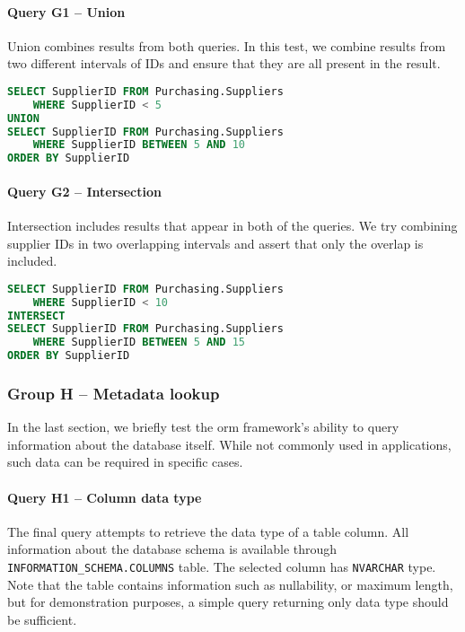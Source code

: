 \paragraph{Query G1 -- Union}
\label{query:g1}
Union combines results from both queries. In this test, we combine results from two different intervals of IDs and ensure that they are all present in the result.

\begin{lstlisting}[language=SQL]
SELECT SupplierID FROM Purchasing.Suppliers 
    WHERE SupplierID < 5
UNION
SELECT SupplierID FROM Purchasing.Suppliers 
    WHERE SupplierID BETWEEN 5 AND 10
ORDER BY SupplierID
\end{lstlisting}

\paragraph{Query G2 -- Intersection}
\label{query:g2}
Intersection includes results that appear in both of the queries. We try combining supplier IDs in two overlapping intervals and assert that only the overlap is included. 

\begin{lstlisting}[language=SQL]
SELECT SupplierID FROM Purchasing.Suppliers 
    WHERE SupplierID < 10
INTERSECT
SELECT SupplierID FROM Purchasing.Suppliers 
    WHERE SupplierID BETWEEN 5 AND 15
ORDER BY SupplierID
\end{lstlisting}

\subsubsection{Group H -- Metadata lookup}
In the last section, we briefly test the \acrshort{orm} framework's ability to query information about the database itself. While not commonly used in applications, such data can be required in specific cases.

\paragraph{Query H1 -- Column data type}
\label{query:h1}
The final query attempts to retrieve the data type of a table column. All information about the database schema is available through \texttt{INFORMATION\_SCHEMA.COLUMNS} table. The selected column has \texttt{NVARCHAR} type. Note that the table contains information such as nullability, or maximum length, but for demonstration purposes, a simple query returning only data type should be sufficient.

